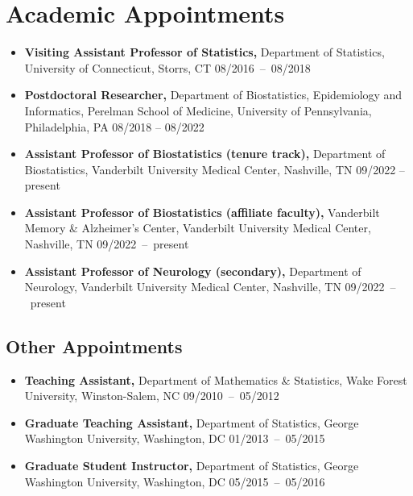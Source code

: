 \documentclass[12pt]{article}
\begin{document}
	\section*{Academic Appointments}
	\begin{itemize}
		\item {\bf Visiting Assistant Professor of Statistics,} 
		Department of Statistics, University of Connecticut, Storrs, 
		CT \hfill \mbox{08/2016 -- 08/2018} 
		\item {\bf Postdoctoral Researcher,} Department of 
		Biostatistics, Epidemiology and Informatics, Perelman School of Medicine, University of Pennsylvania, Philadelphia, PA \hfill 08/2018 -- 08/2022
		\item {\bf Assistant Professor of Biostatistics (tenure track),} Department of Biostatistics, Vanderbilt University Medical Center, Nashville, TN \hfill 09/2022 -- present
		\item {\bf Assistant Professor of Biostatistics (affiliate faculty),} Vanderbilt Memory \& Alzheimer's Center, Vanderbilt University Medical Center, Nashville, TN \hfill \mbox{09/2022 -- present}
		\item {\bf Assistant Professor of Neurology (secondary),} 
		Department of Neurology, Vanderbilt University Medical 
		Center, Nashville, TN \hfill \mbox{09/2022 -- present}
	\end{itemize}

	\subsection*{Other Appointments}
	\begin{itemize}
		\item {\bf Teaching Assistant,} Department of Mathematics \& Statistics, Wake Forest University, Winston-Salem, NC \hfill \mbox{09/2010 -- 05/2012}
		\item {\bf Graduate Teaching Assistant,} Department of 
		Statistics, George Washington University, Washington, DC 
		\hfill \mbox{01/2013 -- 05/2015}
		\item {\bf Graduate Student Instructor,} Department of Statistics, George Washington University, Washington, DC \hfill \mbox{05/2015 -- 05/2016}
	\end{itemize}
\end{document}
